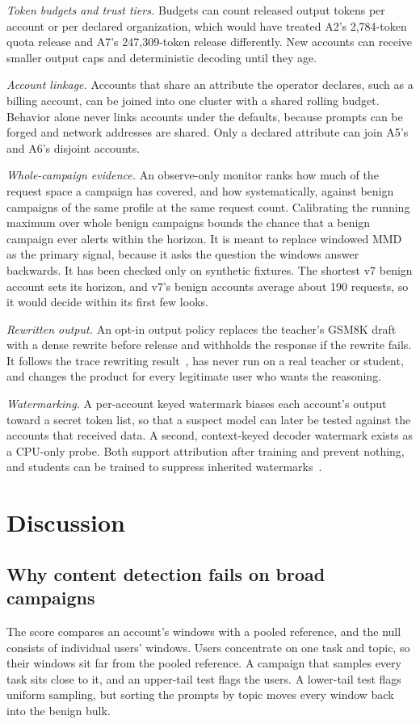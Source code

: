 \documentclass[journal]{IEEEtran}
\begin{document}
\textit{Token budgets and trust tiers.} Budgets can count released output tokens per account or per declared organization, which would have treated A2's 2,784-token quota release and A7's 247,309-token release differently. New accounts can receive smaller output caps and deterministic decoding until they age.

\textit{Account linkage.} Accounts that share an attribute the operator declares, such as a billing account, can be joined into one cluster with a shared rolling budget. Behavior alone never links accounts under the defaults, because prompts can be forged and network addresses are shared. Only a declared attribute can join A5's and A6's disjoint accounts.

\textit{Whole-campaign evidence.} An observe-only monitor ranks how much of the request space a campaign has covered, and how systematically, against benign campaigns of the same profile at the same request count. Calibrating the running maximum over whole benign campaigns bounds the chance that a benign campaign ever alerts within the horizon. It is meant to replace windowed MMD as the primary signal, because it asks the question the windows answer backwards. It has been checked only on synthetic fixtures. The shortest v7 benign account sets its horizon, and v7's benign accounts average about 190 requests, so it would decide within its first few looks.

\textit{Rewritten output.} An opt-in output policy replaces the teacher's GSM8K draft with a dense rewrite before release and withholds the response if the rewrite fails. It follows the trace rewriting result~\cite{ma2026tracerewriting}, has never run on a real teacher or student, and changes the product for every legitimate user who wants the reasoning.

\textit{Watermarking.} A per-account keyed watermark biases each account's output toward a secret token list, so that a suspect model can later be tested against the accounts that received data. A second, context-keyed decoder watermark exists as a CPU-only probe. Both support attribution after training and prevent nothing, and students can be trained to suppress inherited watermarks~\cite{pan2025watermarks}.

\section{Discussion}
\label{sec:discussion}
\subsection{Why content detection fails on broad campaigns}
The score compares an account's windows with a pooled reference, and the null consists of individual users' windows. Users concentrate on one task and topic, so their windows sit far from the pooled reference. A campaign that samples every task sits close to it, and an upper-tail test flags the users. A lower-tail test flags uniform sampling, but sorting the prompts by topic moves every window back into the benign bulk.
\end{document}
